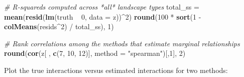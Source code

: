 \documentclass[11pt,]{article}
\newenvironment{Shaded}{\begin{snugshade}}{\end{snugshade}}
\newcommand{\KeywordTok}[1]{\textcolor[rgb]{0.13,0.29,0.53}{\textbf{{#1}}}}
\newcommand{\DataTypeTok}[1]{\textcolor[rgb]{0.13,0.29,0.53}{{#1}}}
\newcommand{\DecValTok}[1]{\textcolor[rgb]{0.00,0.00,0.81}{{#1}}}
\newcommand{\StringTok}[1]{\textcolor[rgb]{0.31,0.60,0.02}{{#1}}}
\newcommand{\CommentTok}[1]{\textcolor[rgb]{0.56,0.35,0.01}{\textit{{#1}}}}
\newcommand{\NormalTok}[1]{{#1}}
\begin{document}
\begin{Shaded}
\begin{Highlighting}[]
\CommentTok{# R-squareds computed across *all* landscape types}
\NormalTok{total_ss =}\StringTok{ }\KeywordTok{mean}\NormalTok{(}\KeywordTok{resid}\NormalTok{(}\KeywordTok{lm}\NormalTok{(truth ~}\StringTok{ }\DecValTok{0}\NormalTok{, }\DataTypeTok{data =} \NormalTok{z))^}\DecValTok{2}\NormalTok{)}
\KeywordTok{round}\NormalTok{(}\DecValTok{100} \NormalTok{*}\StringTok{ }\KeywordTok{sort}\NormalTok{(}\DecValTok{1} \NormalTok{-}\StringTok{ }\KeywordTok{colMeans}\NormalTok{(resids^}\DecValTok{2}\NormalTok{) /}\StringTok{ }\NormalTok{total_ss), }\DecValTok{1}\NormalTok{)}


\CommentTok{# Rank correlations among the methods that estimate marginal relationships}
\KeywordTok{round}\NormalTok{(}\KeywordTok{cor}\NormalTok{(z[ , }\KeywordTok{c}\NormalTok{(}\DecValTok{7}\NormalTok{, }\DecValTok{10}\NormalTok{, }\DecValTok{12}\NormalTok{)], }\DataTypeTok{method =} \StringTok{"spearman"}\NormalTok{)[,}\DecValTok{1}\NormalTok{], }\DecValTok{2}\NormalTok{)}
\end{Highlighting}
\end{Shaded}

Plot the true interactions versus estimated interactions for two
methods:
\end{document}
